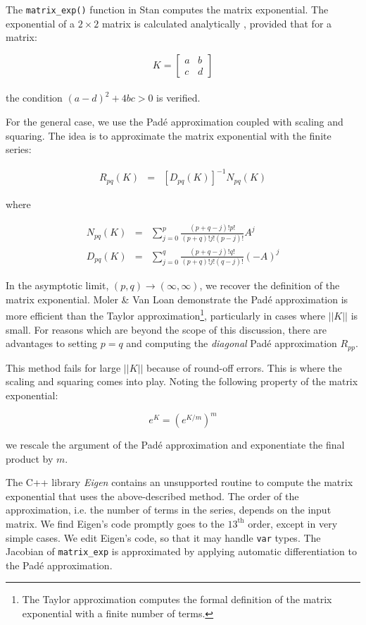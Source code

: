 \documentclass[11pt]{amsart}
\begin{document}
The \texttt{matrix\_exp()} function in Stan computes the matrix exponential. The exponential
 of a $2 \times 2$ matrix is calculated analytically \cite{ToddWeisstein}, provided that for a matrix:

$$   K = \left[\begin{array}{cc}
	a & b \\
	c & d
	\end{array}\right] $$ \\

the condition $ (a - d)^2 + 4bc > 0$ is verified.

For the general case, we use the Pad\'e approximation coupled with scaling and squaring. 
The  idea is to approximate the matrix exponential with the finite series:

\begin{eqnarray*}
  R_{pq}(K) &=& [D_{pq}(K)]^{-1}  N_{pq}(K)
\end{eqnarray*}

where

\begin{eqnarray*}
  N_{pq}(K) &=& \sum_{j=0}^p \frac{(p + q - j)! p!}{(p + q)! j! (p - j)!}A^j \\
  D_{pq}(K) &=& \sum_{j=0}^q \frac{(p + q - j)! q!}{(p + q)! j! (q - j)!}(-A)^j
\end{eqnarray*}

In the asymptotic limit, $(p, q) \rightarrow (\infty, \infty)$, we recover the  definition of the 
matrix exponential. Moler \& Van Loan \cite{MolerAndVanLoan:2003} demonstrate  the 
Pad\'e approximation is more efficient than the Taylor approximation\footnote{The Taylor
approximation computes the formal definition of the matrix exponential with a finite 
number of terms.}, particularly in cases where $||K||$ is small. For reasons which are beyond
the scope of this discussion, there are advantages to setting $p = q$ and computing the 
\textit{diagonal} Pad\'e approximation $R_{pp}$.

This method fails for large $||K||$ because of round-off errors. This is where the scaling 
and squaring comes into play. Noting the following property of the matrix exponential:

$$ e^K = (e^{K/m})^m $$

we rescale the argument of the Pad\'e approximation and exponentiate the final product 
by $m$.

The C++ library \textit{Eigen} \cite{Eigen:2013} contains an unsupported routine to compute the matrix 
exponential that uses the above-described method. The order of the approximation, i.e. 
the number of terms in the series, depends on the input matrix. We find Eigen's code promptly
goes to the $13^{\text{th}}$ order, except in very simple cases. We edit Eigen's code, so that
it may handle \texttt{var} types. The Jacobian of \texttt{matrix\_exp} is approximated by applying 
automatic differentiation to the Pad\'e approximation.
\end{document}
